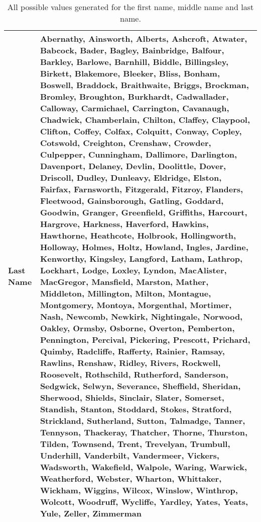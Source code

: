 \begin{table*}
{\begin{tabular}{lp{21cm}}
            Last Name & Abernathy, Ainsworth, Alberts, Ashcroft, Atwater, Babcock, Bader, Bagley, Bainbridge, Balfour, Barkley, Barlowe, Barnhill, Biddle, Billingsley, Birkett, Blakemore, Bleeker, Bliss, Bonham, Boswell, Braddock, Braithwaite, Briggs, Brockman, Bromley, Broughton, Burkhardt, Cadwallader, Calloway, Carmichael, Carrington, Cavanaugh, Chadwick, Chamberlain, Chilton, Claffey, Claypool, Clifton, Coffey, Colfax, Colquitt, Conway, Copley, Cotswold, Creighton, Crenshaw, Crowder, Culpepper, Cunningham, Dallimore, Darlington, Davenport, Delaney, Devlin, Doolittle, Dover, Driscoll, Dudley, Dunleavy, Eldridge, Elston, Fairfax, Farnsworth, Fitzgerald, Fitzroy, Flanders, Fleetwood, Gainsborough, Gatling, Goddard, Goodwin, Granger, Greenfield, Griffiths, Harcourt, Hargrove, Harkness, Haverford, Hawkins, Hawthorne, Heathcote, Holbrook, Hollingworth, Holloway, Holmes, Holtz, Howland, Ingles, Jardine, Kenworthy, Kingsley, Langford, Latham, Lathrop, Lockhart, Lodge, Loxley, Lyndon, MacAlister, MacGregor, Mansfield, Marston, Mather, Middleton, Millington, Milton, Montague, Montgomery, Montoya, Morgenthal, Mortimer, Nash, Newcomb, Newkirk, Nightingale, Norwood, Oakley, Ormsby, Osborne, Overton, Pemberton, Pennington, Percival, Pickering, Prescott, Prichard, Quimby, Radcliffe, Rafferty, Rainier, Ramsay, Rawlins, Renshaw, Ridley, Rivers, Rockwell, Roosevelt, Rothschild, Rutherford, Sanderson, Sedgwick, Selwyn, Severance, Sheffield, Sheridan, Sherwood, Shields, Sinclair, Slater, Somerset, Standish, Stanton, Stoddard, Stokes, Stratford, Strickland, Sutherland, Sutton, Talmadge, Tanner, Tennyson, Thackeray, Thatcher, Thorne, Thurston, Tilden, Townsend, Trent, Trevelyan, Trumbull, Underhill, Vanderbilt, Vandermeer, Vickers, Wadsworth, Wakefield, Walpole, Waring, Warwick, Weatherford, Webster, Wharton, Whittaker, Wickham, Wiggins, Wilcox, Winslow, Winthrop, Wolcott, Woodruff, Wycliffe, Yardley, Yates, Yeats, Yule, Zeller, Zimmerman
            \\ \hline
        \end{tabular}
    }
    \caption{All possible values generated for the first name, middle name and last name.}
    \label{tab:names}
\end{table*}